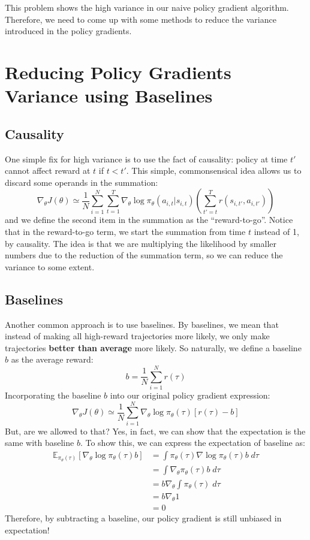 This problem shows the high variance in our naive policy gradient algorithm. Therefore, we need to come up with some methods to reduce the variance introduced in the policy gradients. 
\section{Reducing Policy Gradients Variance using Baselines}
\subsection{Causality}
One simple fix for high variance is to use the fact of causality: policy at time $t'$ cannot affect reward at $t$ if $t<t'$. This simple, commonsensical idea allows us to discard some operands in the summation:
$$\nabla_\theta J(\theta) \simeq \frac{1}{N}\sum_{i=1}^N\sum_{t=1}^T\nabla_\theta \log\pi_\theta(a_{i,t}|s_{i,t})\left(\sum_{t'=t}^T r(s_{i,t'},a_{i,t'})\right)$$
and we define the second item in the summation as the ``reward-to-go''. Notice that in the reward-to-go term, we start the summation from time $t$ instead of 1, by causality. The idea is that we are multiplying the likelihood by smaller numbers due to the reduction of the summation term, so we can reduce the variance to some extent.
\subsection{Baselines}
Another common approach is to use baselines. By baselines, we mean that instead of making all high-reward trajectories more likely, we only make trajectories \textbf{better than average} more likely. So naturally, we define a baseline $b$ as the average reward:
$$b = \frac{1}{N} \sum_{i=1}^Nr(\tau)$$
Incorporating the baseline $b$ into our original policy gradient expression:
$$\nabla_\theta J(\theta) \simeq \frac{1}{N}\sum_{i=1}^N \nabla_\theta \log\pi_\theta(\tau)\left[r(\tau)-b\right]$$
But, are we allowed to that? Yes, in fact, we can show that the expectation is the same with baseline $b$. To show this, we can express the expectation of baseline as:
\begin{align*}
\mathbb{E}_{\pi_\theta(\tau)}\left[\nabla_\theta\log \pi_\theta(\tau)b\right]&=
\int \pi_\theta(\tau)\nabla \log\pi_\theta(\tau)b\;d\tau\\
&=\int \nabla_\theta \pi_\theta(\tau)b\;d\tau\\
&=b\nabla_\theta\int\pi_\theta(\tau)\;d\tau\\
&=b\nabla_\theta 1\\
&=0
\end{align*}
Therefore, by subtracting a baseline, our policy gradient is still unbiased in expectation!
